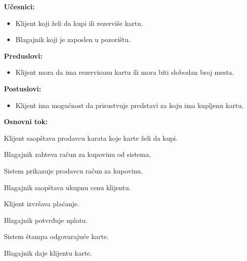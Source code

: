 \documentclass[a4paper]{article}
\begin{document}
\noindent\textbf{Učesnici:} 
  \begin{itemize}
    \item Klijent koji želi da kupi ili rezerviše kartu.
    \item Blagajnik koji je zaposlen u pozorištu.
  \end{itemize}

  \noindent\textbf{Preduslovi:} 
  \begin{itemize}
    \item Klijent mora da ima rezervisanu kartu ili mora biti slobodan broj mesta.
  \end{itemize}

  \noindent\textbf{Postuslovi:} 
  \begin{itemize}
    \item Klijent ima mogućnost da prisustvuje predstavi za koju ima kupljenu kartu.
  \end{itemize}

  \noindent\textbf{Osnovni tok:}
  \begin{legal}
    \item Klijent saopštava prodavcu karata koje karte želi da kupi.
    \item Blagajnik zahteva račun za kupovinu od sistema.
    \item Sistem prikazuje prodavcu račun za kupovinu.
    \item Blagajnik saopštava ukupnu cenu klijentu.
    \item Klijent izvršava plaćanje.
    \item Blagajnik potvrđuje uplatu.
    \item Sistem štampa odgovarajuće karte.
    \item Blagajnik daje klijentu karte.
  \end{legal}
\end{document}
